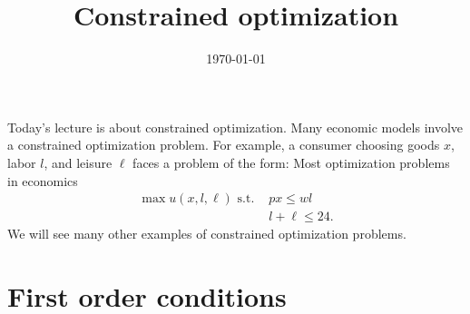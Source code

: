 \documentclass[12pt,reqno]{amsart}
\title{Constrained optimization}
\date{\today}
\theoremstyle{definition}
\begin{document}
\maketitle

Today's lecture is about constrained optimization. Many economic
models involve a constrained optimization problem. For example, a
consumer choosing goods $x$, labor $l$, and leisure $\ell$ faces a
problem of the form: Most optimization problems in economics
\begin{align*} 
  \max u(x,l,\ell) \text{ s.t. } & px \leq wl \\
  & l + \ell \leq 24.
\end{align*}
We will see many other examples of constrained optimization problems. 

\section{First order conditions}
\end{document}
